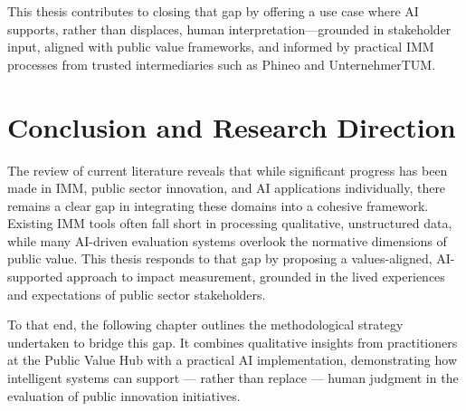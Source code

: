 This thesis contributes to closing that gap by offering a use case where AI supports, rather than displaces, human interpretation—grounded in stakeholder input, aligned with public value frameworks, and informed by practical IMM processes from trusted intermediaries such as Phineo and UnternehmerTUM.

\section{Conclusion and Research Direction}

The review of current literature reveals that while significant progress has been made in IMM, public sector innovation, and AI applications individually, there remains a clear gap in integrating these domains into a cohesive framework. Existing IMM tools often fall short in processing qualitative, unstructured data, while many AI-driven evaluation systems overlook the normative dimensions of public value. This thesis responds to that gap by proposing a values-aligned, AI-supported approach to impact measurement, grounded in the lived experiences and expectations of public sector stakeholders.

To that end, the following chapter outlines the methodological strategy undertaken to bridge this gap. It combines qualitative insights from practitioners at the Public Value Hub with a practical AI implementation, demonstrating how intelligent systems can support — rather than replace — human judgment in the evaluation of public innovation initiatives.